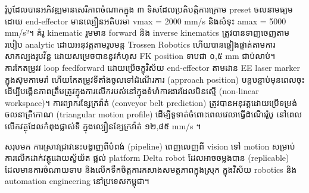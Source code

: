 {    %
    រ៉ូបូដែលបានអភិវឌ្ឍមានសេរីភាពចំណាកក្នុង ៣ ទិសដែលប្រតិបត្តិការក្រោម preset ចលនាមធ្យម ដោយ end-effector មានល្បឿនអតិបរមា vmax = 2000 mm/s និងសំទុះ amax = 5000 mm/s²។ គំរូ kinematic រួមមាន forward និង inverse kinematics ត្រូវបានទាញចេញតាមរបៀប analytic ដោយអនុវត្តតាមរូបមន្ត Trossen Robotics ហើយបានផ្ទៀងផ្ទាត់តាមការសាកល្បងរូបវ័ន្ត ដោយសម្រេចបាននូវកំហុស FK position ទាបជា ០,៥ mm ជាប់លាប់។ ការកែតម្រូវវ loop feedforward ដោយប្រើចក្ខុវិស័យ end-effector តាមដាន EE laser marker ក្នុងស៊ុមកាមេរ៉ា ហើយកែតម្រូវទីតាំងចូលទៅដំណើរការ (approach position) បន្តបន្ទាប់មុនពេលចុះ ដើម្បីបង្កើនភាពត្រឹមត្រូវក្នុងការលើករបស់នៅក្នុងទំហំការងារដែលមិនស្មើ (non-linear workspace)។ ការព្យាករខ្សែក្រវ៉ាត់ (conveyor belt prediction) ត្រូវបានអនុវត្តដោយប្រើទម្រង់ចលនាត្រីកោណ (triangular motion profile) ដើម្បីទូទាត់ចំពោះពេលវេលាធ្វើដំណើររ៉ូបូ នៅពេលលើកវត្ថុដែលកំពុងផ្លាស់ទី ក្នុងល្បឿនខ្សែក្រវ៉ាត់ ១២,៨៥ mm/s ។
    \par
    \hspace{1.27cm}
    សរុបមក ការស្រាវជ្រាវនេះបង្ហាញពីបំពង់ (pipeline) ពេញលេញពី vision ទៅ motion សម្រាប់ការលើកដាក់វត្ថុដោយស្វ័យ័ត ផ្អល់ platform Delta robot ដែលអាចចម្លងបាន (replicable) ដែលមានការចំណាយទាប និងលើកទឹកចិត្តការកសាងសមត្ថភាពក្នុងស្រុក ក្នុងវិស័យ robotics និង automation engineering នៅប្រទេសកម្ពុជា។
}
